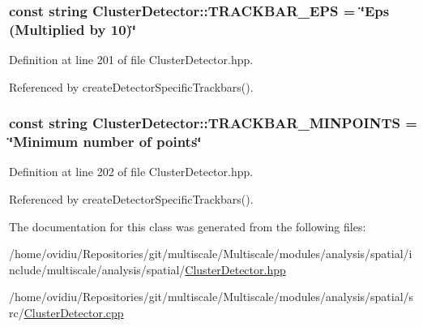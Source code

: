 \hypertarget{classmultiscale_1_1analysis_1_1ClusterDetector_a656f64f88c73c25824e5a4416a742aaf}{
\subsubsection[{\-T\-R\-A\-C\-K\-B\-A\-R\-\_\-\-E\-P\-S}]{\setlength{\rightskip}{0pt plus 5cm}const string {\bf \-Cluster\-Detector\-::\-T\-R\-A\-C\-K\-B\-A\-R\-\_\-\-E\-P\-S} = \char`\"{}\-Eps (\-Multiplied by 10)\char`\"{}}}\label{classmultiscale_1_1analysis_1_1ClusterDetector_a656f64f88c73c25824e5a4416a742aaf}


\-Definition at line 201 of file \-Cluster\-Detector.\-hpp.



\-Referenced by create\-Detector\-Specific\-Trackbars().

\hypertarget{classmultiscale_1_1analysis_1_1ClusterDetector_a7f0fbbf3de8479b106893c4a8161bdaf}{
\subsubsection[{\-T\-R\-A\-C\-K\-B\-A\-R\-\_\-\-M\-I\-N\-P\-O\-I\-N\-T\-S}]{\setlength{\rightskip}{0pt plus 5cm}const string {\bf \-Cluster\-Detector\-::\-T\-R\-A\-C\-K\-B\-A\-R\-\_\-\-M\-I\-N\-P\-O\-I\-N\-T\-S} = \char`\"{}\-Minimum number of points\char`\"{}}}\label{classmultiscale_1_1analysis_1_1ClusterDetector_a7f0fbbf3de8479b106893c4a8161bdaf}


\-Definition at line 202 of file \-Cluster\-Detector.\-hpp.



\-Referenced by create\-Detector\-Specific\-Trackbars().



\-The documentation for this class was generated from the following files\-:\begin{DoxyCompactItemize}
\item 
/home/ovidiu/\-Repositories/git/multiscale/\-Multiscale/modules/analysis/spatial/include/multiscale/analysis/spatial/\hyperlink{ClusterDetector_8hpp}{\-Cluster\-Detector.\-hpp}\item 
/home/ovidiu/\-Repositories/git/multiscale/\-Multiscale/modules/analysis/spatial/src/\hyperlink{ClusterDetector_8cpp}{\-Cluster\-Detector.\-cpp}\end{DoxyCompactItemize}
